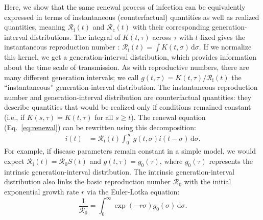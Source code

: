 \documentclass[12pt]{article}
\newcommand{\eref}[1]{Eq.~\ref{eq:#1}}
\newcommand{\Rx}[1]{\ensuremath{{\mathcal R}_{#1}}\xspace}
\newcommand{\Ro}{\Rx{0}}
\newcommand{\Rc}{\Rx{\mathrm{c}}}
\newcommand{\Ri}{\Rx{\mathrm{i}}}
\newcommand{\dd}[1]{\ensuremath{\, \mathrm{d}#1}}
\newcommand{\dsigma}{\dd{\sigma}}
\begin{document}
Here, we show that the same renewal process of infection can be equivalently expressed in terms of instantaneous (counterfactual) quantities as well as realized quantities, meaning $\Ri(t)$ and $\Rc(t)$ with their corresponding generation-interval distributions.
The integral of $K(t, \tau)$ across $\tau$ with $t$ fixed gives the instantaneous reproduction number \citep{fraser2007estimating}: $\Ri(t) = \int K(t, \sigma) \dsigma$.
If we normalize this kernel, we get a generation-interval distribution, which provides information about the time scale of transmission.
As with reproductive numbers, there are many different generation intervals; we call $g(t, \tau) = K(t, \tau)/\Ri(t)$ the ``instantaneous'' generation-interval distribution.
The instantaneous reproduction number and generation-interval distribution are counterfactual quantities: they describe quantities that would be realized only if conditions remained constant (i.e., if $K(s, \tau) = K(t, \tau)$ for all $s \geq t$).
The renewal equation (\eref{renewal}) can be rewritten using this decomposition:
\begin{align}
i(t) &= \Ri(t) \int_0^\infty g(t, \sigma) i(t-\sigma) \dsigma.
\label{eq:renewal_instantaneous}
\end{align}
For example, if disease parameters remain constant in a simple model, we would expect $\Ri(t) = \Ro S(t)$ and $g(t, \tau) = g_0(\tau)$, where $g_0(\tau)$ represents the intrinsic generation-interval distribution.
The intrinsic generation-interval distribution also links the basic reproduction number $\Ro$ with the initial exponential growth rate $r$ via the Euler-Lotka equation:
\begin{equation}
\frac{1}{\Ro} = \int_0^\infty \exp(-r \sigma) g_0(\sigma) \dsigma.
\label{eq:euler_lotka}
\end{equation}
\end{document}
